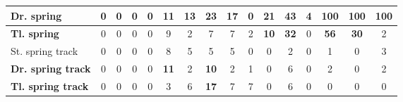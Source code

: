 \begin{table}[H]
\begin{tabular}{|l|c|c|c|c|c|c|c|c|c|c|c|c|c|c|c|}
    \hline
    \textcolor[rgb]{0.851, 0.373, 0.008}{\textbf{Dr. spring}} & 0 & 0 & 0 & 0 & \textbf{11} & \textbf{13} & \textbf{23} & \textbf{17} & 0 & \textbf{21} & \textcolor[rgb]{0.000, 0.620, 0.451}{\textbf{43}} & 4 & \textcolor[rgb]{0.835, 0.369, 0.000}{\textbf{100}} & \textcolor[rgb]{0.835, 0.369, 0.000}{\textbf{100}} & \textcolor[rgb]{0.835, 0.369, 0.000}{\textbf{100}} \\
    \hline
    \textcolor[rgb]{0.000, 0.447, 0.698}{\textbf{Tl. spring}} & 0 & 0 & 0 & 0 & 9 & 2 & 7 & 7 & 2 & \textbf{10} & \textcolor[rgb]{0.000, 0.620, 0.451}{\textbf{32}} & 0 & \textcolor[rgb]{0.000, 0.447, 0.698}{\textbf{56}} & \textcolor[rgb]{0.000, 0.620, 0.451}{\textbf{30}} & 2 \\
    \hline
    St. spring track & 0 & 0 & 0 & 0 & 8 & 5 & 5 & 5 & 0 & 0 & 2 & 0 & 1 & 0 & 3 \\
    \hline
    \textbf{Dr. spring track} & 0 & 0 & 0 & 0 & \textbf{11} & 2 & \textbf{10} & 2 & 1 & 0 & 6 & 0 & 2 & 0 & 2 \\
    \hline
    \textbf{Tl. spring track} & 0 & 0 & 0 & 0 & 3 & 6 & \textbf{17} & 7 & 7 & 0 & 6 & 0 & 0 & 0 & 0 \\
    \hline

\end{tabular}%
\end{table}%



